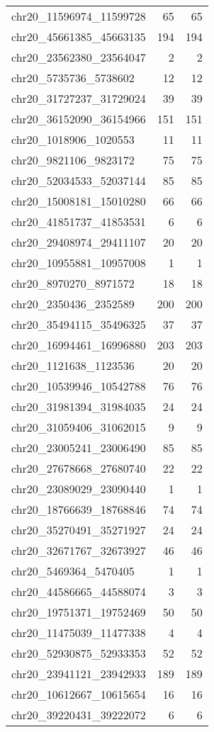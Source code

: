 \begin{longtable}{lrr}
chr20_11596974_11599728 & 65 & 65 \\
chr20_45661385_45663135 & 194 & 194 \\
chr20_23562380_23564047 & 2 & 2 \\
chr20_5735736_5738602 & 12 & 12 \\
chr20_31727237_31729024 & 39 & 39 \\
chr20_36152090_36154966 & 151 & 151 \\
chr20_1018906_1020553 & 11 & 11 \\
chr20_9821106_9823172 & 75 & 75 \\
chr20_52034533_52037144 & 85 & 85 \\
chr20_15008181_15010280 & 66 & 66 \\
chr20_41851737_41853531 & 6 & 6 \\
chr20_29408974_29411107 & 20 & 20 \\
chr20_10955881_10957008 & 1 & 1 \\
chr20_8970270_8971572 & 18 & 18 \\
chr20_2350436_2352589 & 200 & 200 \\
chr20_35494115_35496325 & 37 & 37 \\
chr20_16994461_16996880 & 203 & 203 \\
chr20_1121638_1123536 & 20 & 20 \\
chr20_10539946_10542788 & 76 & 76 \\
chr20_31981394_31984035 & 24 & 24 \\
chr20_31059406_31062015 & 9 & 9 \\
chr20_23005241_23006490 & 85 & 85 \\
chr20_27678668_27680740 & 22 & 22 \\
chr20_23089029_23090440 & 1 & 1 \\
chr20_18766639_18768846 & 74 & 74 \\
chr20_35270491_35271927 & 24 & 24 \\
chr20_32671767_32673927 & 46 & 46 \\
chr20_5469364_5470405 & 1 & 1 \\
chr20_44586665_44588074 & 3 & 3 \\
chr20_19751371_19752469 & 50 & 50 \\
chr20_11475039_11477338 & 4 & 4 \\
chr20_52930875_52933353 & 52 & 52 \\
chr20_23941121_23942933 & 189 & 189 \\
chr20_10612667_10615654 & 16 & 16 \\
chr20_39220431_39222072 & 6 & 6 \\

\end{longtable}
